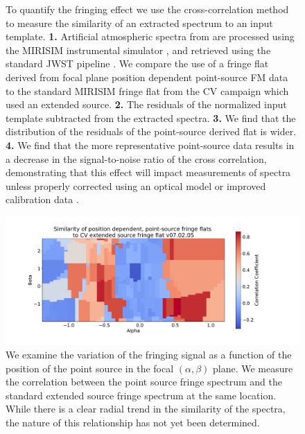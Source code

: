 \documentclass[]{article}
\begin{document}
\begin{figure}[h]
	\caption{To quantify the fringing effect we use the cross-correlation method to measure the similarity of an extracted spectrum to an input template. \textbf{1.} Artificial atmospheric spectra from \cite{Molliere2019} are processed using the MIRISIM instrumental simulator \cite{Consortium2018}, and retrieved using the standard JWST pipeline \cite{Bushouse2015}. We compare the use of a fringe flat derived from focal plane position dependent point-source FM data to the standard MIRISIM fringe flat from the CV campaign which used an extended source. \textbf{2.} The residuals of the normalized input template subtracted from the extracted spectra. \textbf{3.} We find that the distribution of the residuals of the point-source derived flat is wider. \textbf{4.} We find that the more representative point-source data results in a decrease in the signal-to-noise ratio of the cross correlation, demonstrating that this effect will impact measurements of spectra unless properly corrected using an optical model or improved calibration data \cite{Argyriou2018}.}
\end{figure}
\begin{figure}[h]
	\centering
	\includegraphics[width=\linewidth,trim = 2cm 0.5cm 4cm 5cm]{PosnCor_v5}
	\caption{We examine the variation of the fringing signal as a function of the position of the point source in the focal $(\alpha,\beta)$ plane. We measure the correlation between the point source fringe spectrum and the standard extended source fringe spectrum at the same location. While there is a clear radial trend in the similarity of the spectra, the nature of this relationship has not yet been determined.}
\end{figure}
\end{document}

